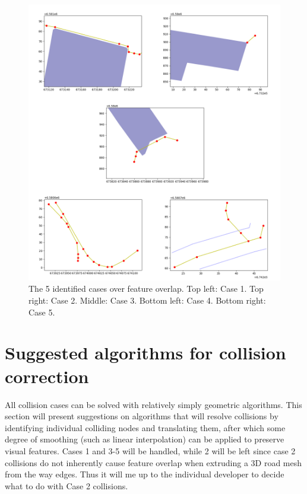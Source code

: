 \documentclass{kththesis}
\begin{document}
\begin{figure}[H]
    \centering
    \includegraphics[width=\textwidth,height=0.5\textheight,keepaspectratio]{img_feature_overlap_cases}
    \caption{The 5 identified cases over feature overlap. Top left: Case 1. Top right: Case 2. Middle: Case 3. Bottom left: Case 4. Bottom right: Case 5.}
    \label{fig:collision-cases}
\end{figure}

\section{Suggested algorithms for collision correction}

All collision cases can be solved with relatively simply geometric algorithms. This section will present suggestions on algorithms that will resolve collisions by identifying individual colliding nodes and translating them, after which some degree of smoothing (such as linear interpolation) can be applied to preserve visual features. Cases 1 and 3-5 will be handled, while 2 will be left since case 2 collisions do not inherently cause feature overlap when extruding a 3D road mesh from the way edges. Thus it will me up to the individual developer to decide what to do with Case 2 collisions.
\end{document}
